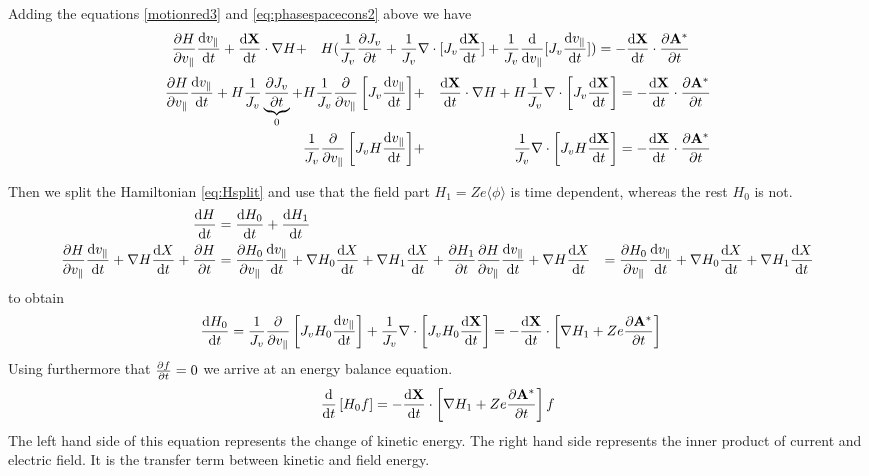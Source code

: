 Adding the equations \eqref{motionred3} and \eqref{eq:phasespacecons2} above we have 
\begin{align}
\pd{ H}{ v_\parallel} \d{v_\parallel}{t}
+  \d{\bf X}{ t} \cdot \nabla H 
&+&H
(
\frac{1 }{ J_v} \pd{J_v}{ t} 
+ \frac{1 }{ J_v} \nabla \cdot  [ J_v \d{\bf X}{ t}  ] 
+ \frac{1 }{ J_v}\d{}{ v_\parallel}  [ J_v \d{v_\parallel}{ t}  ] 
)
&=
- \d{\bf X}{t} \cdot \pd{ {\bf A}^*}{ t} 
\end{align}
\begin{align}
\pd{H}{v_\parallel} \d{v_\parallel}{t} 
+ H \frac{1 }{ J_v} \underbrace{\pd{J_v}{ t}}_0
+ H \frac{1 }{ J_v}\pd{}{ v_\parallel} \left [ J_v \d{v_\parallel}{ t} \right ]
&+& 
  \d{\bf X}{t} \cdot \nabla H 
+ H \frac{1 }{ J_v} \nabla \cdot \left [ J_v \d{\bf X}{t} \right ]
&= 
-  \d{\bf X}{t} \cdot \pd{{\bf A}^*}{t} 
\\
\frac{1 }{ J_v} \pd{}{ v_\parallel} \left [J_v H \d{v_\parallel}{t} \right ] 
&+&
\frac{1 }{ J_v} \nabla \cdot \left [ J_v H \d{\bf X}{t} \right ] 
&= - \d{\bf X}{t} \cdot \pd{{\bf A}^*}{t} 
\end{align}

Then we split the Hamiltonian \eqref{eq:Hsplit} and use that the field part $H_1 = Z e \langle \phi \rangle$ is time dependent, whereas the rest $H_0$ is not.
\begin{align}
 \d{H}{t} &= \d{H_0}{t} + \d{H_1}{t} \\
\pd{H}{v_\parallel}\d{v_\parallel}{t} + \nabla H \d{X}{t} + \pd{H}{t} &= \pd{H_0}{v_\parallel}\d{v_\parallel}{t} + \nabla H_0 \d{X}{t} + \nabla H_1 \d{X}{t} + \pd{H_1}{t}
\pd{H}{v_\parallel}\d{v_\parallel}{t} + \nabla H \d{X}{t}&= \pd{H_0}{v_\parallel}\d{v_\parallel}{t} + \nabla H_0 \d{X}{t} + \nabla H_1 \d{X}{t} 
\end{align}
to obtain 
\begin{align} 
\d{ H_0 }{t} = 
\frac{1 }{ J_v} \pd{}{ v_\parallel} \left [J_v H_0 \d{v_\parallel}{t} \right ] + 
\frac{1 }{ J_v} \nabla \cdot \left [ J_v H_0 \d{\bf X}{t} \right ] 
&= - \d{\bf X}{t} \cdot \left [  \nabla H_1 + Z e \pd{{\bf A}^*}{t} \right ]  
\end{align}
Using furthermore that $\pd{f}{t} = 0$ we arrive at an energy balance equation. 
\begin{equation} 
\d{ }{ t} \left [ H_0 f \right ] 
= -  \d{\bf X}{t} \cdot \left [  \nabla H_1 + Z e \pd{{\bf A}^*}{t} \right ] f 
\label{eq:energyconsParticles}
\end{equation} 
The left hand side of this equation represents the change of kinetic energy.
The right hand side represents the inner product of
current and electric field. It is the transfer term between kinetic
and field energy.

